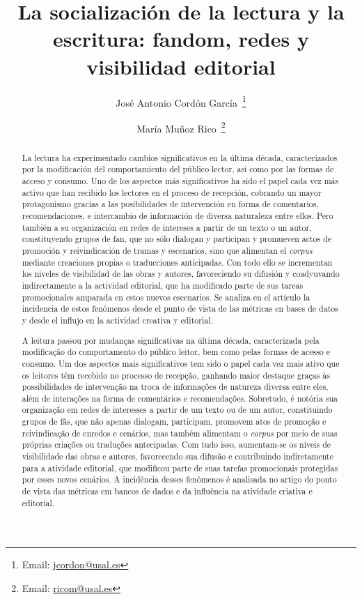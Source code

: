 \documentclass[spanish]{textolivre}
\title{La socialización de la lectura y la escritura: fandom, redes y visibilidad editorial}
\author[1]{José Antonio Cordón García~\orcid{0000-0002-8569-9417}\thanks{Email: \href{mailto:jcordon@usal.es}{jcordon@usal.es}}}
\author[2]{María Muñoz Rico~\orcid{0000-0002-7333-4832}\thanks{Email: \href{mailto:ricom@usal.es}{ricom@usal.es}}}
\affil[1]{Universidad de Salamanca, Facultad de Traducción y Documentación, Departamento de Biblioteconomía y Documentación, Salamanca, España.}
\affil[2]{Universidad de Salamanca, Grupo E-lectra de Investigación, Instituto de Estudios Medievales, Renacentistas y de Humanidades Digitales (IEMYRhd), Salamanca, España.}
\begin{document}
\maketitle

\begin{polyabstract}
\begin{abstract}
La lectura ha experimentado cambios significativos en la última década, caracterizados por la modificación del comportamiento del público lector, así como por las formas de acceso y consumo. Uno de los aspectos más significativos ha sido el papel cada vez más activo que han recibido los lectores en el proceso de recepción, cobrando un mayor protagonismo gracias a las posibilidades de intervención en forma de comentarios, recomendaciones, e intercambio de información de diversa naturaleza entre ellos. Pero también a su organización en redes de intereses a partir de un texto o un autor, constituyendo grupos de fan, que no sólo dialogan y participan y promueven actos de promoción y reivindicación de tramas y escenarios, sino que alimentan el \textit{corpus} mediante creaciones propias o traducciones anticipadas. Con todo ello se incrementan los niveles de visibilidad de las obras y autores, favoreciendo su difusión y coadyuvando indirectamente a la actividad editorial, que ha modificado parte de sus tareas promocionales amparada en estos nuevos escenarios. Se analiza en el artículo la incidencia de estos fenómenos desde el punto de vista de las métricas en bases de datos y desde el influjo en la actividad creativa y editorial.

\end{abstract}

\begin{portuguese}
\begin{abstract}
A leitura passou por mudanças significativas na última década, caracterizada pela modificação do comportamento do público leitor, bem como pelas formas de acesso e consumo. Um dos aspectos mais significativos tem sido o papel cada vez mais ativo que os leitores têm recebido no processo de recepção, ganhando maior destaque graças às possibilidades de intervenção na troca de informações de natureza diversa entre eles, além de interações na forma de comentários e recomendações. Sobretudo, é notória sua organização em redes de interesses a partir de um texto ou de um autor, constituindo grupos de fãs, que não apenas dialogam, participam, promovem atos de promoção e reivindicação de enredos e cenários, mas também alimentam o \textit{corpus} por meio de suas próprias criações ou traduções antecipadas. Com tudo isso, aumentam-se os níveis de visibilidade das obras e autores, favorecendo sua difusão e contribuindo indiretamente para a atividade editorial, que modificou parte de suas tarefas promocionais protegidas por esses novos cenários. A incidência desses fenômenos é analisada no artigo do ponto de vista das métricas em bancos de dados e da influência na atividade criativa e editorial.


\end{abstract}
\end{portuguese}
\end{polyabstract}
\end{document}
